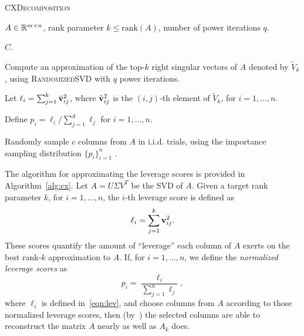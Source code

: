 \begin{algorithm}[tb]
 \caption{\textsc{CXDecomposition}}
  \label{alg:cx}
  \begin{algorithmic}[1]
    \Require $A \in \mathbb{R}^{m\times n}$, rank parameter $k \leq \textrm{rank}(A)$, number of power iterations $q$.

    \Ensure $C$.
    

    \State Compute an approximation of the top-$k$ right singular vectors of $A$ denoted by $\tilde V_k$, using \textsc{RandomizedSVD} with $q$ power iterations.
    
    \State Let $\ell_i = \sum_{j=1}^k \tilde {\mathbf{v}}_{ij}^2$, where $\tilde {\mathbf{v}}_{ij}^2$ is the $(i,j)$-th element of $\tilde V_k$, for $i = 1, \ldots, n$. 
    
    \State Define $p_i = \ell_i / \sum_{j=1}^d \ell_j$ for $i=1,\ldots,n$.
    
    \State Randomly sample $c$ columns from $A$ in i.i.d. trials, using the importance sampling distribution $\{p_i\}_{i=1}^n$ .

    

    \end{algorithmic}
\end{algorithm}

The algorithm for approximating the leverage scores is
provided in Algorithm~\ref{alg:cx}.
Let $A=U\Sigma V^T$ be the SVD of $A$.
Given a target rank parameter $k$, for $i=1,\ldots,n$, the $i$-th leverage score is defined as
\begin{equation}
 \label{eqn:lev}
  \ell_i = \sum_{j=1}^k \mathbf{v}_{ij}^2.
\end{equation}
These scores quantify the amount of ``leverage'' each column of $A$ exerts on the best rank-$k$ approximation to $A$. 
If, for $i=1,\ldots,n$, we define the {\it normalized leverage scores} as
\begin{equation}
\label{eqn:nlev}
  p_i = \frac{\ell_i}{\sum_{j=1}^n \ell_j},
\end{equation}      
where $\ell_i$ is defined in~\eqref{eqn:lev}, and choose columns from $A$ according to those normalized leverage scores, then (by~\cite{DMM08,CUR_PNAS}) the selected columns are able to reconstruct the matrix $A$ nearly as well as $A_k$ does.

